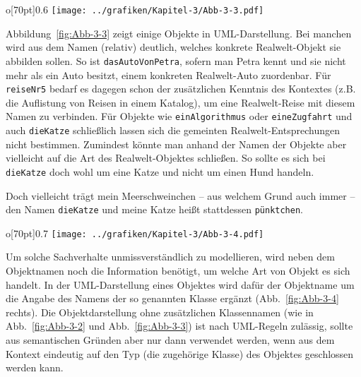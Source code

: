 \begin{wrapfigure}{o}[70pt]{0.6\textwidth}
	\centering 
	\texttt{[image: ../grafiken/Kapitel-3/Abb-3-3.pdf]}
	\caption{Einige Objekte}
	\label{fig:Abb-3-3}
	\vspace{-6pt}
\end{wrapfigure}
Abbildung~\ref{fig:Abb-3-3} zeigt einige Objekte in UML-Darstellung.
Bei manchen wird aus dem Namen (relativ) deutlich, welches konkrete Realwelt-Objekt sie abbilden sollen. So ist \texttt{dasAutoVonPetra}, sofern man Petra kennt und sie nicht mehr als ein Auto besitzt, einem konkreten Realwelt-Auto zuordenbar. Für \texttt{reiseNr5} bedarf es dagegen schon der zusätzlichen Kenntnis des Kontextes (z.B. die Auflistung von Reisen in einem Katalog), um eine Realwelt-Reise mit diesem Namen zu verbinden. Für Objekte wie \texttt{einAlgorithmus} oder \texttt{eineZugfahrt} und auch \texttt{dieKatze} schließlich lassen sich die gemeinten Realwelt-Entsprechungen nicht bestimmen. Zumindest könnte man anhand der Namen der Objekte aber vielleicht auf die Art des Realwelt-Objektes schließen. So sollte es sich bei \texttt{dieKatze} doch wohl um eine Katze und nicht um einen Hund handeln.


Doch vielleicht trägt mein Meerschweinchen – aus welchem Grund auch immer – den Namen \texttt{dieKatze} und meine Katze heißt stattdessen \texttt{pünktchen}. \begin{wrapfigure}{o}[70pt]{0.7\textwidth}
	\centering 
	\texttt{[image: ../grafiken/Kapitel-3/Abb-3-4.pdf]}
	\caption{Links: Ein Objekt namens \texttt{pünktchen} und ein Objekt namens \texttt{dieKatze}. Rechts: Ein Katzen-Objekt namens \texttt{pünktchen} und ein Meerschweinchen-Objekt namens \texttt{dieKatze}}
	\label{fig:Abb-3-4}
	\vspace{-6pt}
\end{wrapfigure}
Um solche Sachverhalte unmissverständlich zu modellieren, wird neben dem Objektnamen noch die Information benötigt, um welche Art von Objekt es sich handelt. In der UML-Darstellung eines Objektes wird dafür der Objektname um die Angabe des Namens der so genannten Klasse ergänzt (Abb.~\ref{fig:Abb-3-4} rechts). Die Objektdarstellung ohne zusätzlichen Klassennamen (wie in Abb.~\ref{fig:Abb-3-2} und Abb.~\ref{fig:Abb-3-3}) ist nach UML-Regeln zulässig, sollte aus semantischen Gründen aber nur dann verwendet werden, wenn aus dem Kontext eindeutig auf den Typ (die zugehörige Klasse) des Objektes geschlossen werden kann.

